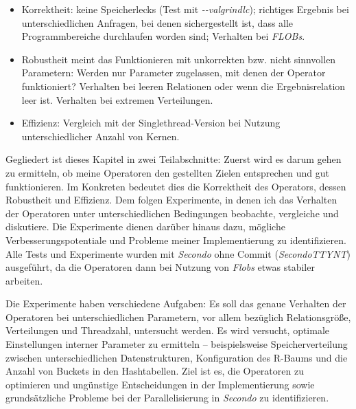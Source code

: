 \documentclass[a4paper,12pt,twoside]{article}
\newcommand{\Fb}[1]{\textit{#1}} %
\begin{document}
\begin{itemize}
	\item Korrektheit: keine Speicherlecks (Test mit \Fb{-{}-valgrindlc}); richtiges Ergebnis bei unterschiedlichen Anfragen, bei denen sichergestellt ist, dass alle Programmbereiche durchlaufen worden sind; Verhalten bei \Fb{FLOBs}.
	\item Robustheit meint das Funktionieren mit unkorrekten bzw. nicht sinnvollen Parametern: Werden nur Parameter zugelassen, mit denen der Operator funktioniert? Verhalten bei leeren Relationen oder wenn die Ergebnisrelation leer ist. Verhalten bei extremen Verteilungen.
	\item Effizienz: Vergleich mit der Singlethread-Version bei Nutzung unterschiedlicher Anzahl von Kernen. 
\end{itemize}

Gegliedert ist dieses Kapitel in zwei Teilabschnitte: Zuerst wird es darum gehen zu ermitteln, ob meine Operatoren den gestellten Zielen entsprechen und gut funktionieren. Im Konkreten bedeutet dies die Korrektheit des Operators, dessen Robustheit und Effizienz. Dem folgen Experimente, in denen ich das Verhalten der Operatoren unter unterschiedlichen Bedingungen beobachte, vergleiche und diskutiere. Die Experimente dienen darüber hinaus dazu, mögliche Verbesserungspotentiale und Probleme meiner Implementierung zu identifizieren. Alle Tests und Experimente wurden mit \Fb{Secondo} ohne Commit (\Fb{SecondoTTYNT}) ausgeführt, da die Operatoren dann bei Nutzung von \Fb{Flobs} etwas stabiler arbeiten. 

Die Experimente haben verschiedene Aufgaben: Es soll das genaue Verhalten der Operatoren bei unterschiedlichen Parametern, vor allem bezüglich Relationsgröße, Verteilungen und Threadzahl, untersucht werden. Es wird versucht, optimale Einstellungen interner Parameter zu ermitteln -- beispielsweise Speicherverteilung zwischen unterschiedlichen Datenstrukturen, Konfiguration des R-Baums und die Anzahl von Buckets in den Hashtabellen. Ziel ist es, die Operatoren zu optimieren und ungünstige Entscheidungen in der Implementierung sowie grundsätzliche Probleme bei der Parallelisierung in \Fb{Secondo} zu identifizieren.
\end{document}
